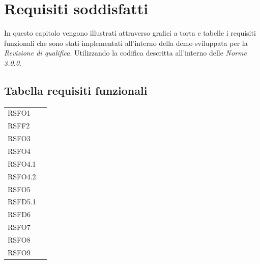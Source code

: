 \chapter{Requisiti soddisfatti}
In questo capitolo vengono illustrati attraverso grafici a torta e tabelle i requisiti funzionali che sono stati implementati all'interno della demo sviluppata per la \textit{Revisione di qualifica}. Utilizzando la codifica descritta all'interno delle \textit{Norme 3.0.0}.

\section{Tabella requisiti funzionali}
\def\tabularxcolumn#1{m{#1}}
{

	\begin{center}
		\renewcommand{\arraystretch}{1.4}
		\begin{longtable}{|p{4cm}|p{4cm}|}
			\hline
			\rowcolor{airforceblue}
			\makecell[c]{\textbf{Codice Requisito}} & \makecell[c]{\textbf{Soddisfatto}} \\
			\hline
			\centering RSFO1  & \makecell[tc]{Soddisfatto} \\
			\hline
			\centering RSFF2 & \makecell[tc]{Non soddisfatto} \\
			\hline
			\centering RSFO3 & \makecell[tc]{Soddisfatto}  \\
			\hline
			\centering RSFO4 & \makecell[tc]{Soddisfatto}  \\
			\hline
			\centering RSFO4.1 & \makecell[tc]{Soddisfatto}  \\
			\hline
			\centering RSFO4.2  & \makecell[tc]{Soddisfatto}  \\
			\hline
			\centering RSFO5 & \makecell[tc]{Soddisfatto}  \\
			\hline
			\centering RSFD5.1 & \makecell[tc]{Non soddisfatto}  \\
			\hline
			\centering RSFD6 & \makecell[tc]{Non soddisfatto}  \\
			\hline
			\centering RSFO7 & \makecell[tc]{Soddisfatto}  \\
			\hline
			\centering RSFO8  &  \makecell[tc]{Soddisfatto} 	\\
			\hline
			\centering RSFO9 &  \makecell[tc]{Soddisfatto} 	\\

\end{longtable}
\end{center}}
